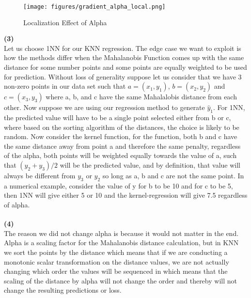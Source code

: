 \documentclass[submit]{harvardml}
\begin{document}
\begin{figure}
\centering
\texttt{[image: figures/gradient\_alpha\_local.png]}
\caption{Localization Effect of Alpha}
\label{fig:test}
\end{figure}

\begin{tcolorbox}[breakable]

\textbf{(3)}\\

Let us choose 1NN for our KNN regression. The edge case we want to exploit is how the methods differ when the Mahalanobis Function comes up with the same distance for some number points and some points are equally weighted to be used for prediction. Without loss of generality suppose let us consider that we have 3 non-zero points in our data set such that $a = (x_1, y_1)$,  $b = (x_2, y_2)$ and $c = (x_3, y_3)$ where a, b, and c have the same Mahalalobis distance from each other. Now suppose we are using our regression method to generate $\hat{y}_1$. For 1NN, the predicted value will have to be a single point selected either from b or c, where based on the sorting algorithm of the distances, the choice is likely to be random. Now consider the kernel function, for the function, both b and c have the same distance away from point a and therefore the same penalty, regardless of the alpha, both points will be weighted equally towards the value of a, such that $(y_2 + y_3)/2$ will be the predicted value, and by definition, that value will always be different from $y_3$ or $y_2$ so long as a, b and c are not the same point. In a numerical example, consider the value of y for b to be 10 and for c to be 5, then 1NN will give either 5 or 10 and the kernel-regression will give 7.5 regardless of alpha.\\\\

\textbf{(4)}\\

The reason we did not change alpha is because it would not matter in the end. Alpha is a scaling factor for the Mahalanobis distance calculation, but in KNN we sort the points by the distance which means that if we are conducting a monotonic scalar transformation on the distance values, we are not actually changing which order the values will be sequenced in which means that the scaling of the distance by alpha will not change the order and thereby will not change the resulting predictions or loss.




\end{tcolorbox}
\end{document}
